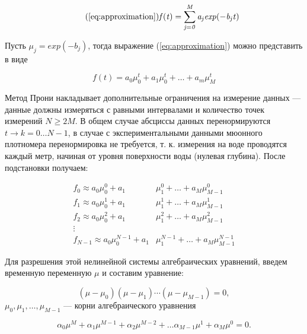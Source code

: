 \begin{equation}
  \tag{\ref{eq:approximation}}
  \mathit{ f(t)  = \displaystyle\sum_{j=0}^M a_j exp(-b_j t) }  
\end{equation}

Пусть $\mu_j = exp(-b_j)$, тогда выражение (\ref{eq:approximation}) можно представить в виде 

\begin{equation}
  \label{eq:prony_nonlinear}
  \mathit{ f(t)  = a_0 \mu_0^t + a_1 \mu_0^t + \ldots + a_m \mu_M^t }
\end{equation}


Метод Прони накладывает дополнительные ограничения на измерение данных --- данные должны измеряться с равными 
интервалами и количество точек измерений $N \geq 2M$. В общем случае абсциссы данных перенормируются $t \to k = 0 \ldots N-1$, 
в случае с экспериментальными данными мюонного плотномера перенормировка не требуется, т. к. измерения на воде
проводятся каждый метр, начиная от уровня поверхности воды (нулевая глубина). После подстановки получаем:

\begin{equation}
  \begin{split}
  f_0  \approx a_0 \mu_0^0 + a_1 & \mu_1^0 + \ldots + a_M \mu_{M-1}^0 \\
  f_1  \approx a_0 \mu_0^1 + a_1 & \mu_1^1 + \ldots + a_M \mu_{M-1}^1  \\
  f_2  \approx a_0 \mu_0^2 + a_1 & \mu_1^2 + \ldots + a_M \mu_{M-1}^2  \\
  \vdots & \\
  f_{N-1} \approx a_0 \mu_{0}^{N-1} + a_1 & \mu_{1}^{N-1} + \ldots + a_M \mu_{M-1}^{N-1}
  \end{split}
  \label{eq:prony_system}
\end{equation}

Для разрешения этой нелинейной системы алгебраических уравнений, введем временную переменную $\mu$ и составим уравнение: 

\begin{equation}
\label{eq:prony_algebra}
	\left( \mu - \mu_0 \right) 
	\left( \mu - \mu_1 \right) \cdots 
	\left( \mu - \mu_{M-1} \right) = 0, 
\end{equation}
$\mu_0,\mu_1, \ldots , \mu_{M-1}$ --- корни алгебраического
уравнения 

\begin{equation}
	\label{eq:prony_alpha}
	\alpha_0 \mu ^ M + 
	\alpha_1 \mu ^ {M-1} + 
	\alpha_2 \mu ^ {M-2} + \ldots
	\alpha_{M-1} \mu ^ 1 + 
	\alpha_{M} \mu ^ 0 = 0.
\end{equation}

